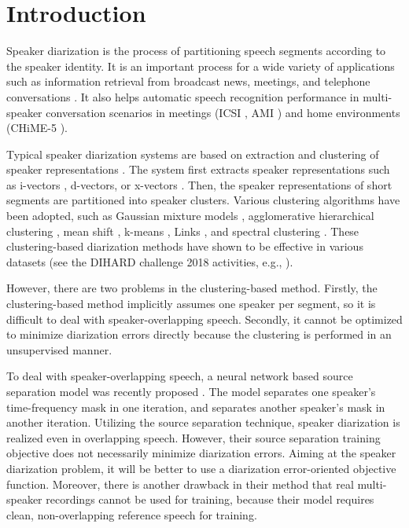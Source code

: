 \documentclass[a4paper]{article}
\begin{document}
\section{Introduction}
\label{sec:intro}
Speaker diarization is the process of partitioning speech segments according to the speaker identity.
It is an important process for a wide variety of applications such as information retrieval from broadcast news, meetings, and telephone conversations \cite{Tranter2006, Anguera2012}.
It also helps automatic speech recognition performance in multi-speaker conversation scenarios in meetings (ICSI \cite{Janin03, etin2006OverlapIM}, AMI \cite{Renals2008, Kanda2019ICASSP}) and home environments (CHiME-5 \cite{Barker2018, Du2018, Boeddecker2018, Kanda2018, Kanda2019ICASSP}).

Typical speaker diarization systems are based on extraction and clustering of speaker representations \cite{Meignier2010LIUMSA,Shum2013,Sell2014, Senoussaoui2014,Dimitriadis2017, Romero2017, Maciejewski2018CharacterizingPO, Wang2018LSTM}.
The system first extracts speaker representations such as i-vectors \cite{Dehak2011, Shum2013, Sell2014, Maciejewski2018CharacterizingPO}, d-vectors\cite{Wan2018, Wang2018LSTM}, or x-vectors \cite{Snyder2018, Romero2017}.
Then, the speaker representations of short segments are partitioned into speaker clusters.
Various clustering algorithms have been adopted, such as
Gaussian mixture models \cite{Meignier2010LIUMSA, Shum2013}, agglomerative hierarchical clustering \cite{Meignier2010LIUMSA, Sell2014, Romero2017, Maciejewski2018CharacterizingPO},
mean shift \cite{Senoussaoui2014}, k-means \cite{Dimitriadis2017, Wang2018LSTM}, Links \cite{Mansfield2018,Wang2018LSTM}, and spectral clustering \cite{Wang2018LSTM}.
These clustering-based diarization methods have shown to be effective in various datasets (see the DIHARD challenge 2018 activities, e.g.,  \cite{Sell2018dihard,Diez2018,Sun2018}).

However, there are two problems in the clustering-based method.
Firstly, the clustering-based method implicitly assumes one speaker per segment, so it is difficult to deal with speaker-overlapping speech.
Secondly, it cannot be optimized to minimize diarization errors directly because the clustering is performed in an unsupervised manner.

To deal with speaker-overlapping speech, a neural network based source separation model was recently proposed \cite{Neumann2019}. The model separates one speaker's time-frequency mask in one iteration, and separates another speaker's mask in another iteration. 
Utilizing the source separation technique, speaker diarization is realized even in overlapping speech.
However, their source separation training objective does not necessarily minimize diarization errors.
Aiming at the speaker diarization problem, it will be better to use a diarization error-oriented objective function.
Moreover, there is another drawback in their method that real multi-speaker recordings cannot be used for training, because their model requires clean, non-overlapping reference speech for training.
\end{document}

